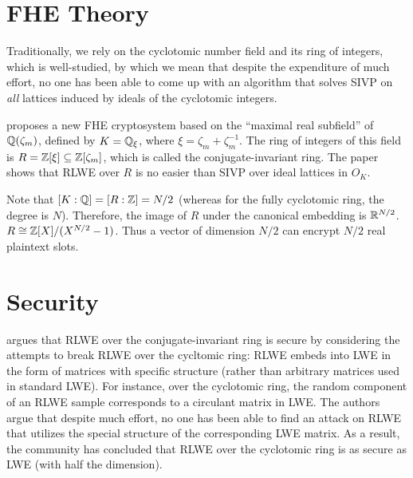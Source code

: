 \documentclass[../fheimpl.tex]{subfiles}
\begin{document}
\section{FHE Theory}
Traditionally, we rely on the cyclotomic number field and its ring of integers, which is well-studied, by which we mean that despite the expenditure of much effort, no one has been able to come up with an algorithm that solves SIVP on \emph{all} lattices induced by ideals of the cyclotomic integers.

\cite{cryptoeprint:2018/952} proposes a new FHE cryptosystem based on the ``maximal real subfield'' of $\mathbb{Q}(\zeta_m)$, defined by $K=\mathbb{Q}_{\xi}$, where $\xi=\zeta_m+\zeta_m^{-1}$. The ring of integers of this field is $R=\mathbb{Z}[\xi]\subseteq \mathbb{Z}[\zeta_m]$, which is called the conjugate-invariant ring. The paper shows that RLWE over $R$ is no easier than SIVP over ideal lattices in $O_K$. 

Note that $[K:\mathbb{Q}]=[R:\mathbb{Z}]=N/2$ (whereas for the fully cyclotomic ring, the degree is $N$). Therefore, the image of $R$ under the canonical embedding is $\mathbb{R}^{N/2}$. $R\cong \mathbb{Z}[X]/(X^{N/2}-1)$. Thus a vector of dimension $N/2$ can encrypt $N/2$ real plaintext slots.

\section{Security}
\cite{cryptoeprint:2018/952} argues that RLWE over the conjugate-invariant ring is secure by considering the attempts to break RLWE over the cycltomic ring: RLWE embeds into LWE in the form of matrices with specific structure (rather than arbitrary matrices used in standard LWE). For instance, over the cyclotomic ring, the random component of an RLWE sample corresponds to a circulant matrix in LWE. The authors argue that despite much effort, no one has been able to find an attack on RLWE that utilizes the special structure of the corresponding LWE matrix. As a result, the community has concluded that RLWE over the cyclotomic ring is as secure as LWE (with half the dimension). 
\end{document}
